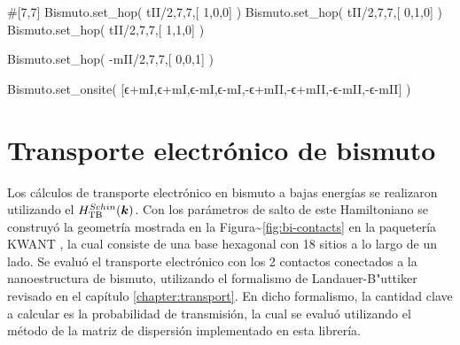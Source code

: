 \documentclass[
  letterpaper,
  DIV=11,
  numbers=noendperiod]{scrreprt}
\newenvironment{Shaded}{\begin{snugshade}}{\end{snugshade}}
\newcommand{\CommentTok}[1]{\textcolor[rgb]{0.37,0.37,0.37}{#1}}
\newcommand{\DecValTok}[1]{\textcolor[rgb]{0.68,0.00,0.00}{#1}}
\newcommand{\NormalTok}[1]{\textcolor[rgb]{0.00,0.23,0.31}{#1}}
\newcommand{\OperatorTok}[1]{\textcolor[rgb]{0.37,0.37,0.37}{#1}}
\begin{document}
\begin{Shaded}
\begin{Highlighting}[]
\CommentTok{\#[7,7]}
\NormalTok{Bismuto.set\_hop(  tII}\OperatorTok{/}\DecValTok{2}\NormalTok{,}\DecValTok{7}\NormalTok{,}\DecValTok{7}\NormalTok{,[ }\DecValTok{1}\NormalTok{,}\DecValTok{0}\NormalTok{,}\DecValTok{0}\NormalTok{] ) }
\NormalTok{Bismuto.set\_hop(  tII}\OperatorTok{/}\DecValTok{2}\NormalTok{,}\DecValTok{7}\NormalTok{,}\DecValTok{7}\NormalTok{,[ }\DecValTok{0}\NormalTok{,}\DecValTok{1}\NormalTok{,}\DecValTok{0}\NormalTok{] ) }
\NormalTok{Bismuto.set\_hop(  tII}\OperatorTok{/}\DecValTok{2}\NormalTok{,}\DecValTok{7}\NormalTok{,}\DecValTok{7}\NormalTok{,[ }\DecValTok{1}\NormalTok{,}\DecValTok{1}\NormalTok{,}\DecValTok{0}\NormalTok{] ) }
 
\NormalTok{Bismuto.set\_hop( }\OperatorTok{{-}}\NormalTok{mII}\OperatorTok{/}\DecValTok{2}\NormalTok{,}\DecValTok{7}\NormalTok{,}\DecValTok{7}\NormalTok{,[ }\DecValTok{0}\NormalTok{,}\DecValTok{0}\NormalTok{,}\DecValTok{1}\NormalTok{] )}


\NormalTok{Bismuto.set\_onsite( [ϵ}\OperatorTok{+}\NormalTok{mI,ϵ}\OperatorTok{+}\NormalTok{mI,ϵ}\OperatorTok{{-}}\NormalTok{mI,ϵ}\OperatorTok{{-}}\NormalTok{mI,}\OperatorTok{{-}}\NormalTok{ϵ}\OperatorTok{+}\NormalTok{mII,}\OperatorTok{{-}}\NormalTok{ϵ}\OperatorTok{+}\NormalTok{mII,}\OperatorTok{{-}}\NormalTok{ϵ}\OperatorTok{{-}}\NormalTok{mII,}\OperatorTok{{-}}\NormalTok{ϵ}\OperatorTok{{-}}\NormalTok{mII] )}
\end{Highlighting}
\end{Shaded}


\hypertarget{transporte-electruxf3nico-de-bismuto}{%
\chapter{Transporte electrónico de
bismuto}\label{transporte-electruxf3nico-de-bismuto}}

Los cálculos de transporte electrónico en bismuto a bajas energías se
realizaron utilizando el \(H_{\rm TB}^{Schin} (\boldsymbol{k})\). Con los
parámetros de salto de este Hamiltoniano se construyó la geometría
mostrada en la Figura\textasciitilde{}\ref{fig:bi-contacts} en la
paquetería KWANT \cite{Groth_2014-KWANT}, la cual consiste de una base
hexagonal con 18 sitios a lo largo de un lado. Se evaluó el transporte
electrónico con los 2 contactos conectados a la nanoestructura de
bismuto, utilizando el formalismo de Landauer-B"uttiker revisado en el
capítulo \ref{chapter:transport}. En dicho formalismo, la cantidad clave
a calcular es la probabilidad de transmisión, la cual se evaluó
utilizando el método de la matriz de dispersión implementado en esta
librería.
\end{document}
